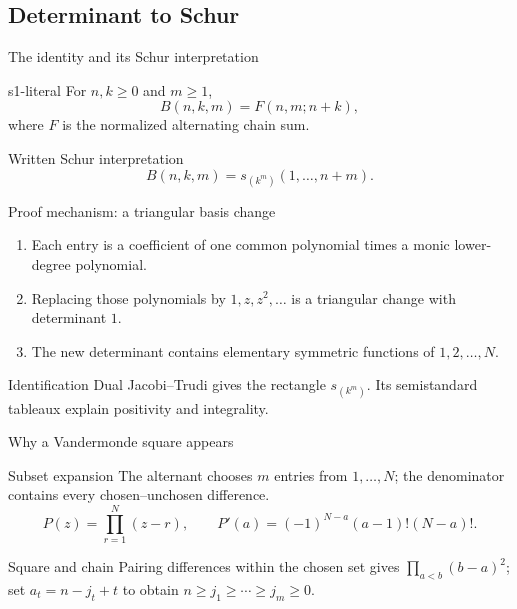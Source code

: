 \documentclass{beamer}
\begin{document}
\subsection{Determinant to Schur}
\begin{frame}{The identity and its Schur interpretation}
  \begin{bookresult}{s1-literal}
    For $n,k\ge0$ and $m\ge1$,
    \[ B(n,k,m)=F(n,m;n+k), \]
    where $F$ is the normalized alternating chain sum.
  \end{bookresult}
  \begin{block}{Written Schur interpretation}
    \[ B(n,k,m)=s_{(k^m)}(1,\ldots,n+m). \]
  \end{block}
\end{frame}
\begin{frame}{Proof mechanism: a triangular basis change}
  \begin{enumerate}
    \item Each entry is a coefficient of one common polynomial times a monic lower-degree polynomial.
    \item Replacing those polynomials by $1,z,z^2,\ldots$ is a triangular change with determinant $1$.
    \item The new determinant contains elementary symmetric functions of $1,2,\ldots,N$.
  \end{enumerate}
  \begin{block}{Identification}
    Dual Jacobi--Trudi gives the rectangle $s_{(k^m)}$. Its semistandard tableaux explain positivity and integrality.
  \end{block}
\end{frame}
\begin{frame}{Why a Vandermonde square appears}
  \begin{block}{Subset expansion}
    The alternant chooses $m$ entries from $1,\ldots,N$; the denominator contains every chosen--unchosen difference.
    \[
      P(z)=\prod_{r=1}^{N}(z-r),\qquad P'(a)=(-1)^{N-a}(a-1)!(N-a)!.
    \]
  \end{block}
  \begin{block}{Square and chain}
    Pairing differences within the chosen set gives $\prod_{a<b}(b-a)^2$; set
    $a_t=n-j_t+t$ to obtain $n\ge j_1\ge\cdots\ge j_m\ge0$.
  \end{block}
\end{frame}
\end{document}
